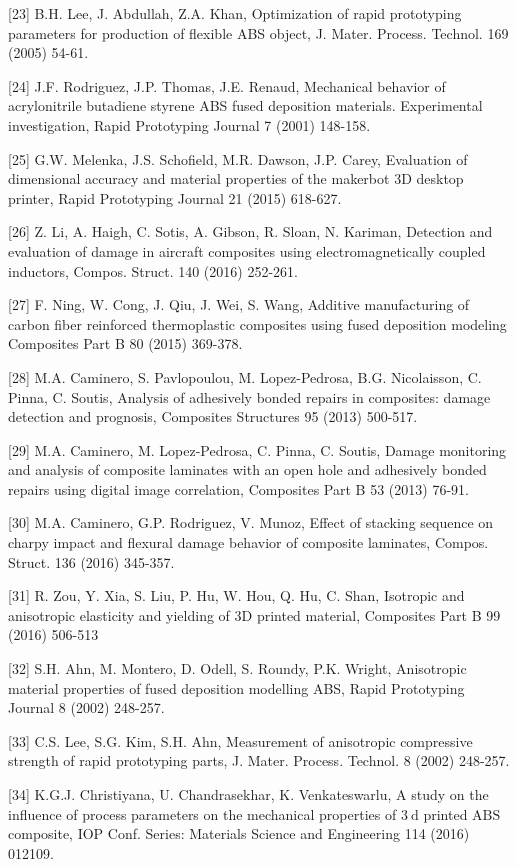 \documentclass[10pt]{article}
\begin{document}
[23] B.H. Lee, J. Abdullah, Z.A. Khan, Optimization of rapid prototyping parameters for production of flexible ABS object, J. Mater. Process. Technol. 169 (2005) 54-61.

[24] J.F. Rodriguez, J.P. Thomas, J.E. Renaud, Mechanical behavior of acrylonitrile butadiene styrene ABS fused deposition materials. Experimental investigation, Rapid Prototyping Journal 7 (2001) 148-158.

[25] G.W. Melenka, J.S. Schofield, M.R. Dawson, J.P. Carey, Evaluation of dimensional accuracy and material properties of the makerbot 3D desktop printer, Rapid Prototyping Journal 21 (2015) 618-627.

[26] Z. Li, A. Haigh, C. Sotis, A. Gibson, R. Sloan, N. Kariman, Detection and evaluation of damage in aircraft composites using electromagnetically coupled inductors, Compos. Struct. 140 (2016) 252-261.

[27] F. Ning, W. Cong, J. Qiu, J. Wei, S. Wang, Additive manufacturing of carbon fiber reinforced thermoplastic composites using fused deposition modeling Composites Part B 80 (2015) 369-378.

[28] M.A. Caminero, S. Pavlopoulou, M. Lopez-Pedrosa, B.G. Nicolaisson, C. Pinna, C. Soutis, Analysis of adhesively bonded repairs in composites: damage detection and prognosis, Composites Structures 95 (2013) 500-517.

[29] M.A. Caminero, M. Lopez-Pedrosa, C. Pinna, C. Soutis, Damage monitoring and analysis of composite laminates with an open hole and adhesively bonded repairs using digital image correlation, Composites Part B 53 (2013) 76-91.

[30] M.A. Caminero, G.P. Rodriguez, V. Munoz, Effect of stacking sequence on charpy impact and flexural damage behavior of composite laminates, Compos. Struct. 136 (2016) 345-357.

[31] R. Zou, Y. Xia, S. Liu, P. Hu, W. Hou, Q. Hu, C. Shan, Isotropic and anisotropic elasticity and yielding of 3D printed material, Composites Part B 99 (2016) 506-513

[32] S.H. Ahn, M. Montero, D. Odell, S. Roundy, P.K. Wright, Anisotropic material properties of fused deposition modelling ABS, Rapid Prototyping Journal 8 (2002) 248-257.

[33] C.S. Lee, S.G. Kim, S.H. Ahn, Measurement of anisotropic compressive strength of rapid prototyping parts, J. Mater. Process. Technol. 8 (2002) 248-257.

[34] K.G.J. Christiyana, U. Chandrasekhar, K. Venkateswarlu, A study on the influence of process parameters on the mechanical properties of $3 \mathrm{~d}$ printed $\mathrm{ABS}$ composite, IOP Conf. Series: Materials Science and Engineering 114 (2016) 012109.
\end{document}

